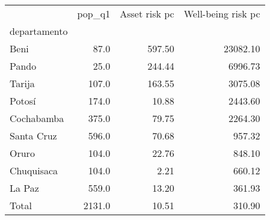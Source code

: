 \begin{tabular}{lrrr}
\toprule
{} &  pop\_q1 &  Asset risk pc &  Well-being risk pc \\
departamento &         &                &                     \\
\midrule
Beni         &    87.0 &         597.50 &            23082.10 \\
Pando        &    25.0 &         244.44 &             6996.73 \\
Tarija       &   107.0 &         163.55 &             3075.08 \\
Potosí       &   174.0 &          10.88 &             2443.60 \\
Cochabamba   &   375.0 &          79.75 &             2264.30 \\
Santa Cruz   &   596.0 &          70.68 &              957.32 \\
Oruro        &   104.0 &          22.76 &              848.10 \\
Chuquisaca   &   104.0 &           2.21 &              660.12 \\
La Paz       &   559.0 &          13.20 &              361.93 \\
Total        &  2131.0 &          10.51 &              310.90 \\
\bottomrule
\end{tabular}
